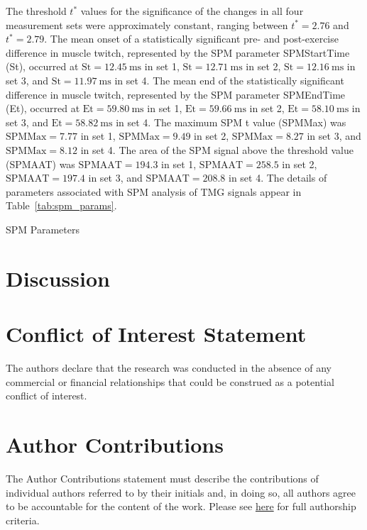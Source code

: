 \documentclass[utf8]{style/FrontiersinHarvard}
\begin{document}
The threshold $ t^{*} $ values for the significance of the changes in all four measurement sets were approximately constant, ranging between $ t^{*} = 2.76 $ and $ t^{*} = 2.79 $.
The mean onset of a statistically significant pre- and post-exercise difference in muscle twitch, represented by the SPM parameter SPMStartTime (St), occurred at 
$ \mathrm{St} = \SI{12.45}{\milli \second} $ in set 1,
$ \mathrm{St} = \SI{12.71}{\milli \second} $ in set 2,
$ \mathrm{St} = \SI{12.16}{\milli \second} $ in set 3, and
$ \mathrm{St} = \SI{11.97}{\milli \second} $ in set 4.
The mean end of the statistically significant difference in muscle twitch, represented by the SPM parameter SPMEndTime (Et), occurred at
$ \mathrm{Et} = \SI{59.80}{\milli \second} $ in set 1,
$ \mathrm{Et} = \SI{59.66}{\milli \second} $ in set 2,
$ \mathrm{Et} = \SI{58.10}{\milli \second} $ in set 3, and
$ \mathrm{Et} = \SI{58.82}{\milli \second} $ in set 4.
The maximum SPM t value (SPMMax) was
$ \mathrm{SPMMax} = 7.77 $ in set 1,
$ \mathrm{SPMMax} = 9.49 $ in set 2,
$ \mathrm{SPMMax} = 8.27 $ in set 3, and
$ \mathrm{SPMMax} = 8.12 $ in set 4.
The area of the SPM signal above the threshold value (SPMAAT) was
$ \mathrm{SPMAAT} = 194.3 $ in set 1,
$ \mathrm{SPMAAT} = 258.5 $ in set 2,
$ \mathrm{SPMAAT} = 197.4 $ in set 3, and
$ \mathrm{SPMAAT} = 208.8 $ in set 4.
The details of parameters associated with SPM analysis of TMG signals appear in Table~\ref{tab:spm_params}.

\begin{table}[htb!]
    \centering
    \caption{SPM Parameters}
    \vspace{1ex}

    \renewcommand{\arraystretch}{1.1}
    
    \label{tab:spm_params}
\end{table}

\section{Discussion}

\section*{Conflict of Interest Statement}
The authors declare that the research was conducted in the absence of any commercial or financial relationships that could be construed as a potential conflict of interest.

\section*{Author Contributions}
The Author Contributions statement must describe the contributions of individual authors referred to by their initials and, in doing so, all authors agree to be accountable for the content of the work.
Please see \href{https://www.frontiersin.org/about/policies-and-publication-ethics#AuthorshipAuthorResponsibilities}{here} for full authorship criteria.
\end{document}
